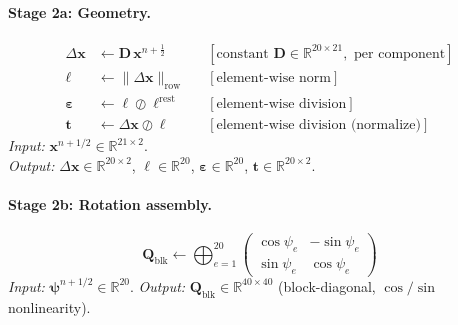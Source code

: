 \documentclass[11pt]{article}
\newcommand{\vect}[1]{\mathbf{#1}}
\newcommand{\mat}[1]{\mathbf{#1}}
\newcommand{\Real}{\mathbb{R}}
\begin{document}
\paragraph{Stage 2a: Geometry.}
\begin{equation}
  \boxed{\;
  \begin{aligned}
    \Delta\vect{x} &\leftarrow \mat{D}\,\vect{x}^{n+\frac{1}{2}}
      && [\text{constant } \mat{D} \in \Real^{20 \times 21}, \text{ per component}] \\
    \bm{\ell} &\leftarrow \|\Delta\vect{x}\|_{\text{row}}
      && [\text{element-wise norm}] \\
    \bm{\varepsilon} &\leftarrow \bm{\ell} \oslash \bm{\ell}^{\text{rest}}
      && [\text{element-wise division}] \\
    \vect{t} &\leftarrow \Delta\vect{x} \oslash \bm{\ell}
      && [\text{element-wise division (normalize)}]
  \end{aligned}
  \;}
  \label{eq:mat-geometry}
\end{equation}
\textit{Input:} $\vect{x}^{n+1/2} \in \Real^{21 \times 2}$. \\
\textit{Output:} $\Delta\vect{x} \in \Real^{20 \times 2}$, $\bm{\ell} \in \Real^{20}$, $\bm{\varepsilon} \in \Real^{20}$, $\vect{t} \in \Real^{20 \times 2}$.

\paragraph{Stage 2b: Rotation assembly.}
\begin{equation}
  \boxed{\;
  \mat{Q}_{\text{blk}} \leftarrow \bigoplus_{e=1}^{20}
    \begin{pmatrix} \cos\psi_e & -\sin\psi_e \\ \sin\psi_e & \cos\psi_e \end{pmatrix}
  \;}
  \label{eq:mat-rotation}
\end{equation}
\textit{Input:} $\bm{\psi}^{n+1/2} \in \Real^{20}$. \quad
\textit{Output:} $\mat{Q}_{\text{blk}} \in \Real^{40 \times 40}$ (block-diagonal, $\cos/\sin$ nonlinearity).
\end{document}
